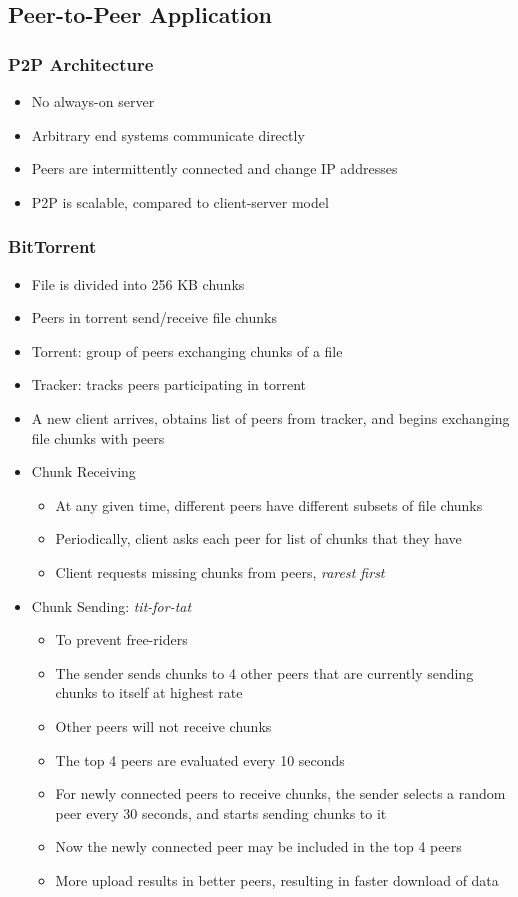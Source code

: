 \subsection{Peer-to-Peer Application}
\subsubsection{P2P Architecture}
\begin{itemize}
	\item No always-on server
	\item Arbitrary end systems communicate directly
	\item Peers are intermittently connected and change IP addresses
	\item P2P is scalable, compared to client-server model
\end{itemize}

\subsubsection{BitTorrent}
\begin{itemize}
	\item File is divided into 256 KB chunks
	\item Peers in torrent send/receive file chunks
	\item Torrent: group of peers exchanging chunks of a file
	\item Tracker: tracks peers participating in torrent
	\item A new client arrives, obtains list of peers from tracker, and begins exchanging file chunks with peers
	\item Chunk Receiving
	\begin{itemize}
		\item At any given time, different peers have different subsets of file chunks
		\item Periodically, client asks each peer for list of chunks that they have
		\item Client requests missing chunks from peers, \textit{rarest first}
	\end{itemize}
	\item Chunk Sending: \textit{tit-for-tat}
	\begin{itemize}
		\item To prevent free-riders
		\item The sender sends chunks to 4 other peers that are currently sending chunks to itself at highest rate
		\item Other peers will not receive chunks
		\item The top 4 peers are evaluated every 10 seconds
		\item For newly connected peers to receive chunks, the sender selects a random peer every 30 seconds, and starts sending chunks to it
		\item Now the newly connected peer may be included in the top 4 peers
		\item More upload results in better peers, resulting in faster download of data
	\end{itemize}
\end{itemize}

